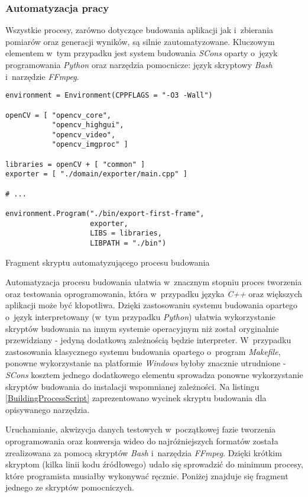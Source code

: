       \subsubsection{Automatyzacja pracy}
      Wszystkie procesy, zarówno dotyczące budowania aplikacji jak i~zbierania pomiarów oraz generacji wyników, są silnie zautomatyzowane. Kluczowym elementem w~tym przypadku jest system budowania \textit{SCons} oparty o~język programowania \textit{Python} oraz narzędzia pomocnicze: język skryptowy \textit{Bash} i~narzędzie \textit{FFmpeg}.

      \begin{sample}[ht]
        \begin{verbatim}
environment = Environment(CPPFLAGS = "-O3 -Wall")

openCV = [ "opencv_core",
           "opencv_highgui",
           "opencv_video",
           "opencv_imgproc" ]

libraries = openCV + [ "common" ]
exporter = [ "./domain/exporter/main.cpp" ]

# ...

environment.Program("./bin/export-first-frame",
                    exporter,
                    LIBS = libraries,
                    LIBPATH = "./bin")
        \end{verbatim}
        \caption{Fragment skryptu automatyzującego procesu budowania}
        \label{BuildingProcessScript}
      \end{sample}

      Automatyzacja procesu budowania ułatwia w~znacznym stopniu proces tworzenia oraz testowania oprogramowania, która w~przypadku języka \textit{C++} oraz większych aplikacji może być kłopotliwa. Dzięki zastosowaniu systemu budowania opartego o~język interpretowany (w~tym przypadku \textit{Python}) ułatwia wykorzystanie skryptów budowania na innym systemie operacyjnym niż został oryginalnie przewidziany - jedyną dodatkową zależnością będzie interpreter. W~przypadku zastosowania klasycznego systemu budowania opartego o~program \textit{Makefile}, ponowne wykorzystanie na platformie \textit{Windows} byłoby znacznie utrudnione - \textit{SCons} kosztem jednego dodatkowego elementu sprowadza ponowne wykorzystanie skryptów budowania do instalacji wspomnianej zależności. Na listingu \ref{BuildingProcessScript} zaprezentowano wycinek skryptu budowania dla opisywanego narzędzia.

      Uruchamianie, akwizycja danych testowych w~początkowej fazie tworzenia oprogramowania oraz konwersja wideo do najróżniejszych formatów została zrealizowana za pomocą skryptów \textit{Bash} i~narzędzia \textit{FFmpeg}. Dzięki krótkim skryptom (kilka linii kodu źródłowego) udało się sprowadzić do minimum procesy, które programista musiałby wykonywać ręcznie. Poniżej znajduje się fragment jednego ze skryptów pomocniczych.

